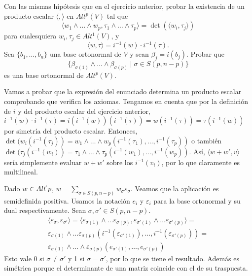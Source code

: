 \documentclass[twoside]{article}
\begin{document}
\newpage

\begin{ejercicio}{2.5}
Con las mismas hipótesis que en el ejercicio anterior, probar la existencia de un producto escalar $\langle,\rangle$ en $Alt^p(V)$ tal que
$$\langle w_1\land\dots\land w_p,\tau_1\land\dots\land\tau_p\rangle=\det(\langle w_i,\tau_j\rangle)$$
para cualesquiera $w_i,\tau_j\in Alt^1(V)$, y 
$$\langle w,\tau\rangle=i^{-1}(w)\cdot i^{-1}(\tau).$$
Sea $\{b_1,\dots, b_n\}$ una base ortonormal de $V$ y sean $\beta_j=i(b_j)$. Probar que
$$\{\beta_{\sigma(1)}\land\dots\land\beta_{\sigma(p)}\mid \sigma\in S(p,n-p)\}$$
es una base ortonormal de $Alt^p(V)$.
\end{ejercicio}
\begin{solucion}
Vamos a probar que la expresión del enunciado determina un producto escalar comprobando que verifica los axiomas. Tengamos en cuenta que por la definición de $i$ y del producto escalar del ejercicio anterior, $i^{-1}(w)\cdot i^{-1}(\tau)=i(i^{-1}(w))(i^{-1}(\tau))=w(i^{-1}(\tau))=\tau(i^{-1}(w))$ por simetría del producto escalar. Entonces, $\det(w_i(i^{-1}(\tau_j))=w_1\land\dots\land w_p(i^{-1}(\tau_1),\dots, i^{-1}(\tau_p))$ o también $\det(\tau_j(i^{-1}(w_i))=\tau_1\land\dots\land\tau_p(i^{-1}(w_1),\dots, i^{-1}(w_p))$. Así, $\langle w+w',v\rangle$ sería simplemente evaluar $w+w'$ sobre los $i^{-1}(v_i)$, por lo que claramente es multilineal. 

Dado $w\in Alt^`p$, $w=\sum_{\sigma\in S(p,n-p)}w_{\sigma}\varepsilon_{\sigma}$. Veamos que la aplicación es semidefinida positiva. Usamos la notación $e_i$ y $\varepsilon_i$ para la base ortonormal y su dual respectivamente. Sean $\sigma,\sigma'\in S(p,n-p)$.
\begin{gather*}
\langle \varepsilon_{\sigma}, \varepsilon_{\sigma'}\rangle=\langle \varepsilon_{\sigma(1)}\land\dots\varepsilon_{\sigma(p)},\varepsilon_{\sigma'(1)}\land\dots\varepsilon_{\sigma'(p)}\rangle=\\
\varepsilon_{\sigma(1)}\land\dots\varepsilon_{\sigma(p)}(i^{-1}(\varepsilon_{\sigma'(1)}),\dots, i^{-1}(\varepsilon_{\sigma'(p)}))=\\
\varepsilon_{\sigma(1)}\land\dots\land\varepsilon_{\sigma(p)}(e_{\sigma'(1)}, \dots, e_{\sigma'(p)})
\end{gather*}
Esto vale 0 si $\sigma\neq\sigma'$ y 1 si $\sigma=\sigma'$, por lo que se tiene el resultado. 
Además es simétrica porque el determinante de una matriz coincide con el de su traspuesta.


\end{solucion}
\end{document}
